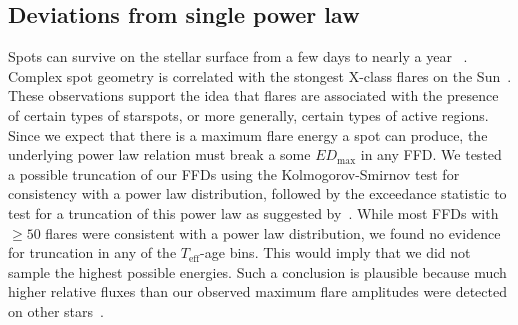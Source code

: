 \documentclass{aa}
\begin{document}
\subsection{Deviations from single power law}
Spots can survive on the stellar surface from a few days to nearly a year~
\citep{namekata_solarstellarwlf_2017, davenport_flaresandspots_2015}. Complex spot geometry is correlated with the stongest X-class flares on the Sun~\citep{toriumi_flaresspotssun_2017, sammis_deltaspotsflares_2000}. These observations support the idea that flares are associated with the presence of certain types of starspots, or more generally, certain types of active regions. Since we expect that there is a maximum flare energy a spot can produce, the underlying power law relation must break a some $ED_\mathrm{max}$ in any FFD. We tested a possible truncation of our FFDs using the Kolmogorov-Smirnov test for consistency with a power law distribution, followed by the exceedance statistic to test for a truncation of this power law as suggested by~\citet{maschberger2009}. While most FFDs with $\geqslant50$ flares were consistent with a power law distribution, we found no evidence for truncation in any of the $T_\mathrm{eff}$-age bins. This would imply that we did not sample the highest possible energies. Such a conclusion is plausible because much higher relative fluxes than our observed maximum flare amplitudes were detected on other stars~\citep{paudel_monsterucdflare_2018, jackman2019, schmidt2016}.
\end{document}
